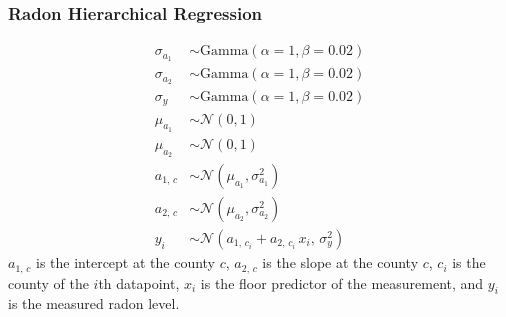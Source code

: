 \subsubsection{Radon Hierarchical Regression}
\begin{align*}
  \sigma_{a_1} &\sim \mathrm{Gamma}\left( \alpha = 1, \beta = 0.02 \right) \\
  \sigma_{a_2} &\sim \mathrm{Gamma}\left( \alpha = 1, \beta = 0.02 \right) \\
  \sigma_{y}  &\sim \mathrm{Gamma}\left( \alpha = 1, \beta = 0.02 \right) \\
  \mu_{a_1}    &\sim \mathcal{N}\left( 0, 1 \right) \\
  \mu_{a_2}    &\sim \mathcal{N}\left( 0, 1 \right) \\
  a_{1,\, c}     &\sim \mathcal{N}\left( \mu_{a_1}, \sigma_{a_1}^2 \right) \\
  a_{2,\, c}     &\sim \mathcal{N}\left( \mu_{a_2}, \sigma_{a_2}^2 \right) \\
  y_i         &\sim \mathcal{N}\left( a_{1,\, c_i} + a_{2,\, c_i}\,x_i,\, \sigma_y^2 \right)
\end{align*}
\(a_{1,\,c}\) is the intercept at the county \(c\), \(a_{2,\,c}\) is the slope at the county \(c\), \(c_i\) is the county of the \(i\)th datapoint, \(x_i\) is the floor predictor of the measurement, and \(y_i\) is the measured radon level.




